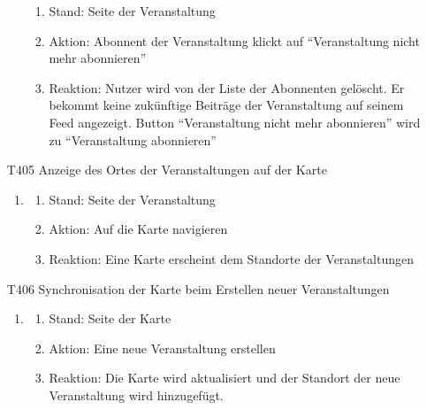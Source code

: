 \documentclass[parskip=full]{scrartcl}
\begin{document}
\begin{itemize}
\begin{enumerate}
			\begin{enumerate}[nosep]
				\item Stand: Seite der Veranstaltung
				\item Aktion: Abonnent der Veranstaltung klickt auf “Veranstaltung nicht mehr abonnieren”
				\item Reaktion: Nutzer wird von der Liste der \gls{Abonnenten} gelöscht. Er bekommt keine zukünftige Beiträge der Veranstaltung auf seinem \gls{Feed} angezeigt. \gls{Button} “Veranstaltung nicht mehr abonnieren” wird zu “Veranstaltung abonnieren”
			\end{enumerate}
		\end{enumerate}
		
		\item[T405] Anzeige des Ortes der Veranstaltungen auf der Karte
		\begin{enumerate}
			\item
			
			\begin{enumerate}[nosep]
				\item Stand: Seite der Veranstaltung
				\item Aktion: Auf die Karte navigieren
				\item Reaktion: Eine Karte erscheint dem Standorte der Veranstaltungen
				
			\end{enumerate}
		\end{enumerate}
		
		\item[T406] Synchronisation der Karte beim Erstellen neuer Veranstaltungen
		\begin{enumerate}
			\item
			
			\begin{enumerate}[nosep]
				\item Stand: Seite der Karte
				\item Aktion: Eine neue Veranstaltung erstellen
				\item Reaktion: Die Karte wird aktualisiert und der Standort der neue Veranstaltung wird  hinzugefügt.
				
			\end{enumerate}
		\end{enumerate}
		
	\end{itemize}
	
	
	
\end{document}
